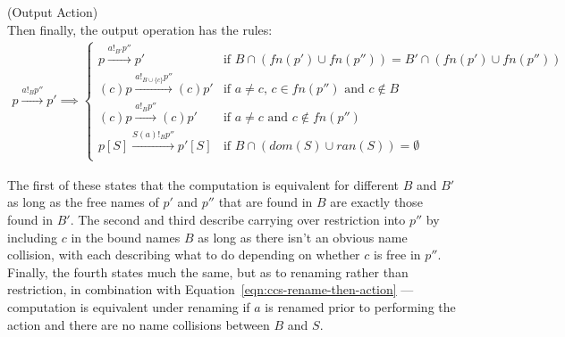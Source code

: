 \documentclass{article}
\begin{document}
        \begin{definition}{(Output Action)\\}
            Then finally, the output operation has the rules:
            \begin{align}
                p \xrightarrow{a!_{B} p''} p' \implies
                \begin{cases}
                    p \xrightarrow{a!_{B'} p''} p'                  & \text{if } B \cap (fn(p') \cup fn(p'')) = B' \cap (fn(p') \cup fn(p'')) \\
                    (c)p \xrightarrow{a!_{B \cup \{c\}} p''} (c)p'  & \text{if } a \neq c \text{, } c \in fn(p'') \text{ and } c \notin B \\
                    (c)p \xrightarrow{a!_{B} p''} (c)p'             & \text{if } a \neq c \text{ and } c \notin fn(p'') \\
                    p[S] \xrightarrow{S(a)!_{B} p''} p'[S]          & \text{if } B \cap (dom(S) \cup ran(S)) = \emptyset \\
                \end{cases}
            \end{align}
        \end{definition}
        The first of these states that the computation is equivalent for different $B$ and $B'$ as long as the free names of $p'$ and $p''$ that are found in $B$ are exactly those found in $B'$.
        The second and third describe carrying over restriction into $p''$ by including $c$ in the bound names $B$ as long as there isn't an obvious name collision, with each describing what to do depending on whether $c$ is free in $p''$.
        Finally, the fourth states much the same, but as to renaming rather than restriction, in combination with Equation~\ref{eqn:ccs-rename-then-action} --- computation is equivalent under renaming if $a$ is renamed prior to performing the action and there are no name collisions between $B$ and $S$. \\
\end{document}
